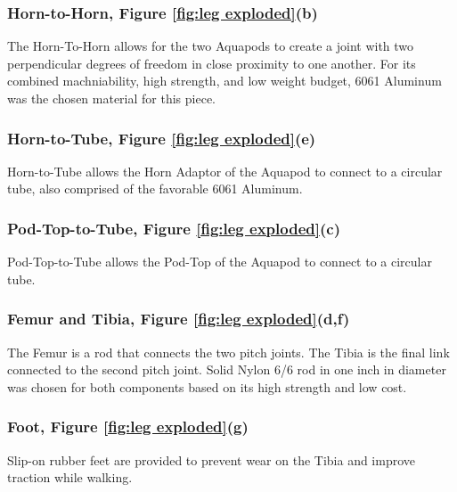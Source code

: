 \subsubsection{Horn-to-Horn, Figure \ref{fig:leg exploded}(b)}
The Horn-To-Horn allows for the two Aquapods to create a joint with two perpendicular degrees of freedom in close proximity to one another. For its combined machniability, high strength, and low weight budget, 6061 Aluminum was the chosen material for this piece.

\subsubsection{Horn-to-Tube, Figure \ref{fig:leg exploded}(e)}
Horn-to-Tube allows the Horn Adaptor of the Aquapod to connect to a circular tube, also comprised of the favorable 6061 Aluminum.

\subsubsection{Pod-Top-to-Tube, Figure \ref{fig:leg exploded}(c)}
Pod-Top-to-Tube allows the Pod-Top of the Aquapod to connect to a circular tube.  


\subsubsection{Femur and Tibia, Figure \ref{fig:leg exploded}(d,f)}
The Femur is a rod that connects the two pitch joints. The Tibia is the final link connected to the second pitch joint. Solid Nylon 6/6 rod in one inch in diameter was chosen for both components based on its high strength and low cost.

\subsubsection{Foot, Figure \ref{fig:leg exploded}(g)}
Slip-on rubber feet are provided to prevent wear on the Tibia and improve traction while walking. 

 

